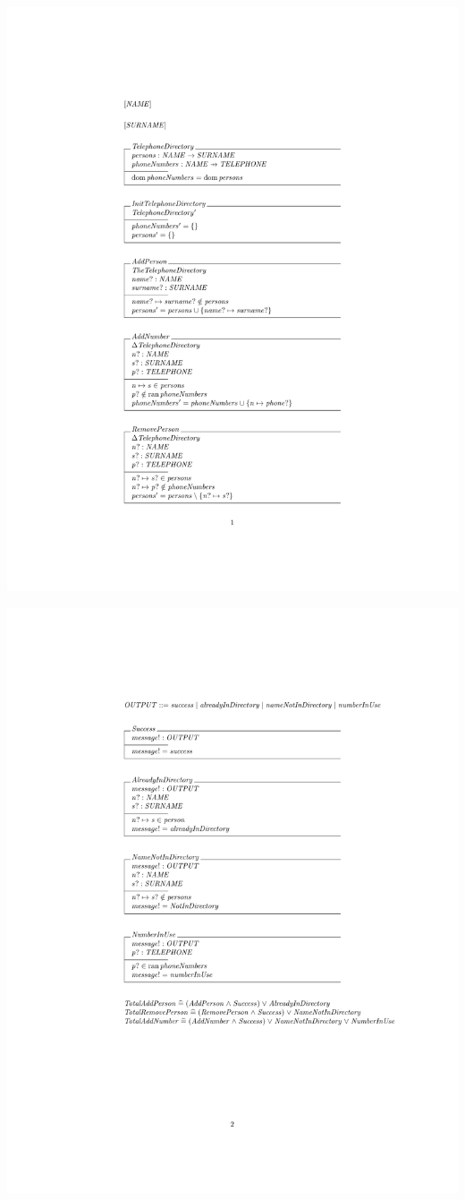 \noindent \includegraphics[clip, trim=4cm 8cm 4cm 4.2cm]{examples/nonworkzcga/0.pdf}

\noindent \includegraphics[clip, trim=4cm 8cm 3cm 4.2cm]{examples/nonworkzcga/0comp2.pdf}

